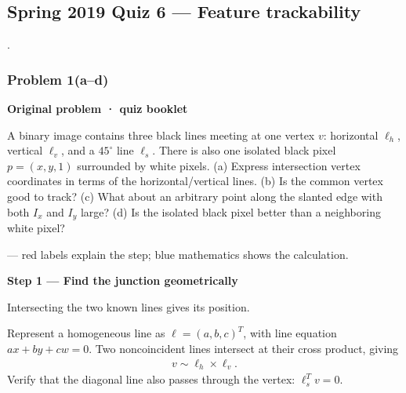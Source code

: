 \documentclass[letterpaper,11pt,english,openany,oneside]{jupyterBook}
\begin{document}
\subsection{Spring 2019 Quiz 6 — Feature trackability}
\label{\detokenize{lectures/lecture05/quiz-workbook:spring-2019-quiz-6-feature-trackability}}\label{\detokenize{lectures/lecture05/quiz-workbook:quiz-source-13}}
\sphinxAtStartPar
{} .


\subsubsection{Problem 1(a–d)}
\label{\detokenize{lectures/lecture05/quiz-workbook:problem-1-ad}}\label{\detokenize{lectures/lecture05/quiz-workbook:quiz-13-q1}}
\par\medskip\textbf{Original problem · quiz booklet}\par\smallskip

\sphinxAtStartPar
A binary image contains three black lines meeting at one vertex \(v\): horizontal \(\ell_h\), vertical \(\ell_v\), and a \(45^\circ\) line \(\ell_s\). There is also one isolated black pixel \(p=(x,y,1)\) surrounded by white pixels. (a) Express intersection vertex coordinates in terms of the horizontal/vertical lines. (b) Is the common vertex good to track? (c) What about an arbitrary point along the slanted edge with both \(I_x\) and \(I_y\) large? (d) Is the isolated black pixel better than a neighboring white pixel?

\par\medskip

\sphinxAtStartPar
{} — red labels explain the step; blue mathematics shows the calculation.

\par\medskip{}
{\color{QuizStepRed}\bfseries Step 1 — Find the junction geometrically}\par\smallskip

\sphinxAtStartPar
{} Intersecting the two known lines gives its position.

\sphinxAtStartPar
Represent a homogeneous line as {\color{QuizMathBlue} \(\ell=(a,b,c)^T\)}, with line equation {\color{QuizMathBlue} \(ax+by+cw=0\)}. Two noncoincident lines intersect at their cross product, giving
{\color{QuizMathBlue} \begin{equation*}
\begin{split}
\boxed{v\sim \ell_h\times\ell_v}.
\end{split}
\end{equation*}}
\sphinxAtStartPar
Verify that the diagonal line also passes through the vertex: {\color{QuizMathBlue} \(\ell_s^Tv=0\)}.
\end{document}
